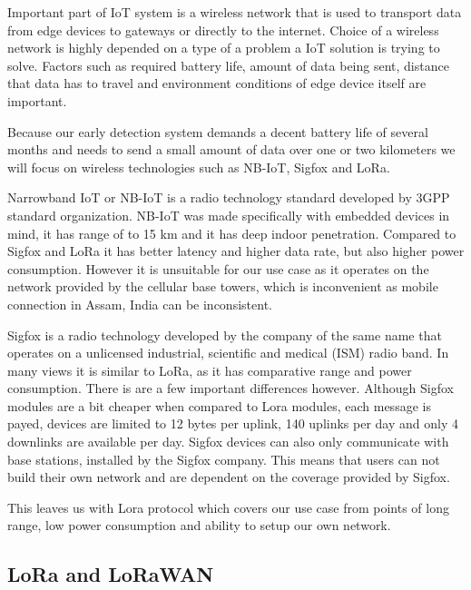 Important part of IoT system is a wireless network that is used to transport data from edge devices to gateways or directly to the internet.
Choice of a wireless network is highly depended on a type of a problem a IoT solution is trying to solve.
Factors such as required battery life, amount of data being sent, distance that data has to travel and environment conditions of edge device itself are important.

Because our early detection system demands a decent battery life of several months and needs to send a small amount of data over one or two kilometers we will focus on wireless technologies such as NB-IoT, Sigfox and LoRa.

Narrowband IoT or NB-IoT is a radio technology standard developed by 3GPP standard organization\cite{lora_nbiot}.
NB-IoT was made specifically with embedded devices in mind, it has range of to 15 \si{\kilo\meter} and it has deep indoor penetration\cite{lora_nbiot}.
Compared to Sigfox and LoRa it has better latency and higher data rate, but also higher power consumption\cite{lora_nbiot_sigfox}.
However it is unsuitable for our use case as it operates on the network provided by the cellular base towers, which is inconvenient as mobile connection in Assam, India can be inconsistent\cite{wildlabs-elephants}.

Sigfox is a radio technology developed by the company of the same name that operates on a unlicensed industrial, scientific and medical (ISM) radio band.
In many views it is similar to LoRa, as it has comparative range and power consumption\cite{lora_nbiot_sigfox}.
There is are a few important differences however.
Although Sigfox modules are a bit cheaper when compared to Lora modules, each message is payed, devices are limited to 12 bytes per uplink, 140 uplinks per day and only 4 downlinks are available per day.
Sigfox devices can also only communicate with base stations, installed by the Sigfox company\cite{lora_nbiot_sigfox}.
This means that users can not build their own network and are dependent on the coverage provided by Sigfox.

This leaves us with Lora protocol which covers our use case from points of long range, low power consumption and ability to setup our own network. 


\subsection{ LoRa and LoRaWAN}

